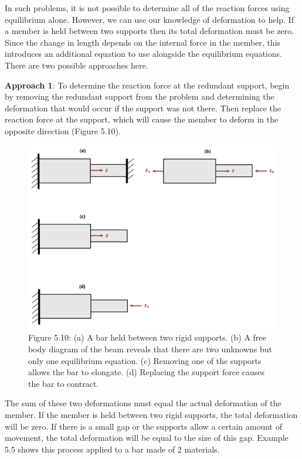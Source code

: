 \documentclass[
  letterpaper,
  DIV=11,
  numbers=noendperiod]{scrreprt}
\theoremstyle{definition}
\theoremstyle{remark}
\begin{document}
In such problems, it is not possible to determine all of the reaction
forces using equilibrium alone. However, we can use our knowledge of
deformation to help. If a member is held between two supports then its
total deformation must be zero. Since the change in length depends on
the internal force in the member, this introduces an additional equation
to use alongside the equilibrium equations. There are two possible
approaches here.

\textbf{Approach 1}: To determine the reaction force at the redundant
support, begin by removing the redundant support from the problem and
determining the deformation that would occur if the support was not
there. Then replace the reaction force at the support, which will cause
the member to deform in the opposite direction (Figure 5.10).

\begin{figure}[H]

{\centering \includegraphics[width=5.40625in,height=\textheight]{images/PNGs/Figure 5.11.png}

}

\caption{Figure 5.10: (a) A bar held between two rigid supports. (b) A
free body diagram of the beam reveals that there are two unknowns but
only one equilibrium equation. (c) Removing one of the supports allows
the bar to elongate. (d) Replacing the support force causes the bar to
contract.}

\end{figure}%

The sum of these two deformations must equal the actual deformation of
the member. If the member is held between two rigid supports, the total
deformation will be zero. If there is a small gap or the supports allow
a certain amount of movement, the total deformation will be equal to the
size of this gap. Example 5.5 shows this process applied to a bar made
of 2 materials.
\end{document}
